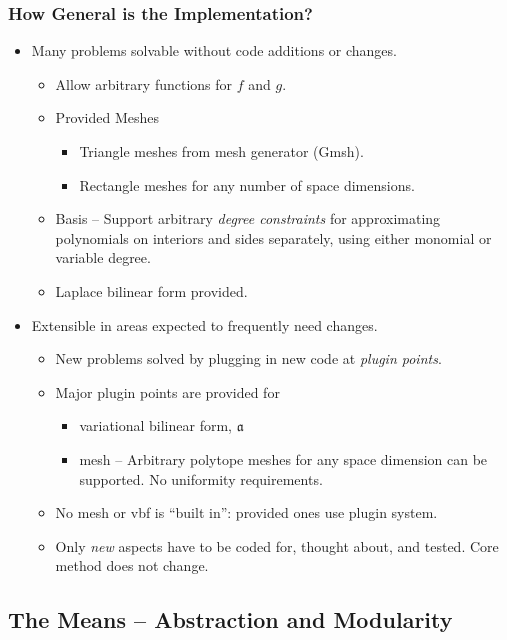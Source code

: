 \documentclass[compress]{beamer}
\begin{document}
\begin{frame}
  \frametitle{How General is the Implementation?}
  \pause
  \begin{itemize}[<+->]
    \item Many problems solvable without code additions or changes.
      \begin{itemize}[<+->]
        \item Allow arbitrary functions for $f$ and $g$.
        \item Provided Meshes
          \begin{itemize}
            \item Triangle meshes from mesh generator (Gmsh).
            \item Rectangle meshes for any number of space dimensions.
          \end{itemize}
        \item Basis -- Support arbitrary \emph{degree constraints} for approximating polynomials on interiors and sides separately,
          using either monomial or variable degree.
        \item Laplace bilinear form provided. 
      \end{itemize}
    \item Extensible in areas expected to frequently need changes.
      \begin{itemize}
        \item New problems solved by plugging in new code at \emph{plugin points}.
        \item Major plugin points are provided for
          \begin{itemize}
            \item variational bilinear form, $\mathfrak{a}$
            \item mesh -- Arbitrary polytope meshes for any space dimension can be supported. No uniformity requirements.
          \end{itemize}
        \item No mesh or vbf is ``built in'': provided ones use plugin system.
        \item Only \emph{new} aspects have to be coded for, thought about, and tested. Core method does not change.
      \end{itemize}
  \end{itemize}
\end{frame}

\subsection{The Means -- Abstraction and Modularity}
\end{document}
